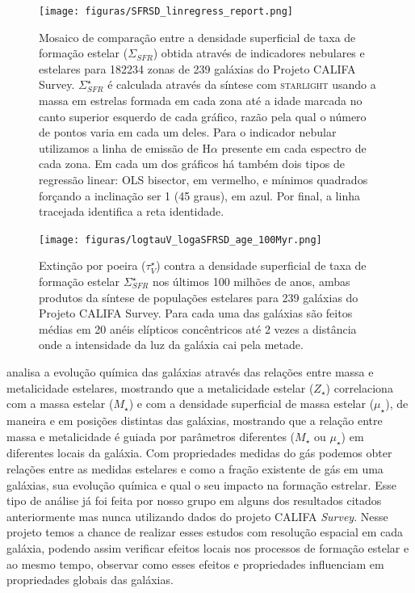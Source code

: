 \documentclass[a4paper,12pt]{article}
\def\starlight{\textsc{starlight}\xspace}      %
\begin{document}
\begin{figure}
	\begin{center}
    \texttt{[image: figuras/SFRSD\_linregress\_report.png]}
    \caption[]{Mosaico de comparação entre a densidade superficial de taxa de formação estelar
    ($\Sigma_{SFR}$) obtida através de indicadores nebulares e estelares para 182234 zonas de 239
    galáxias do Projeto CALIFA Survey. $\Sigma_{SFR}^\star$ é calculada através da síntese com
    \starlight usando a massa em estrelas formada em cada zona até a idade marcada no canto superior
    esquerdo de cada gráfico, razão pela qual o número de pontos varia em cada um deles. Para o
    indicador nebular utilizamos a linha de emissão de H$\alpha$ presente em cada espectro de cada
    zona. Em cada um dos gráficos há também dois tipos de regressão linear: OLS bisector, em
    vermelho, e mínimos quadrados forçando a inclinação ser 1 (45 graus), em azul. Por final, a
    linha tracejada identifica a reta identidade.}
    \label{fig:SFRSDstarXSFRSDneb}
    \end{center}
\end{figure}

\begin{figure}
	\begin{center}
    \texttt{[image: figuras/logtauV\_logaSFRSD\_age\_100Myr.png]}
    \caption[]{Extinção por poeira ($\tau_V^\star$) contra a densidade superficial de taxa de
    formação estelar $\Sigma_{SFR}^\star$ nos últimos 100 milhões de anos, ambas produtos da
    síntese de populações estelares para 239 galáxias do Projeto CALIFA Survey. Para cada uma das
    galáxias são feitos médias em 20 anéis elípticos concêntricos até 2 vezes a distância onde a
    intensidade da luz da galáxia cai pela metade.}
    \label{fig:tauVstarXSFRSDstar}
    \end{center}
\end{figure}

\citet{GonzalezDelgado.etal.2014b} analisa a evolução química das galáxias através das relações
entre massa e metalicidade estelares, mostrando que a metalicidade estelar ($Z_\star$) correlaciona
com a massa estelar ($M_\star$) e com a densidade superficial de massa estelar ($\mu_\star$), de
maneira e em posições distintas das galáxias, mostrando que a relação entre massa e metalicidade é
guiada por parâmetros diferentes ($M_\star$ ou $\mu_\star$) em diferentes locais da galáxia. Com
propriedades medidas do gás podemos obter relações entre as medidas estelares e  como a fração
existente de gás em uma galáxias, sua evolução química e qual o seu impacto na formação estrelar.
Esse tipo de análise já foi feita por nosso grupo em alguns dos resultados citados anteriormente mas
nunca utilizando dados do projeto CALIFA {\em Survey}. Nesse projeto temos a chance de realizar
esses estudos com resolução espacial em cada galáxia, podendo assim verificar efeitos locais nos
processos de formação estelar e ao mesmo tempo, observar como esses efeitos e propriedades
influenciam em propriedades globais das galáxias.
\end{document}
